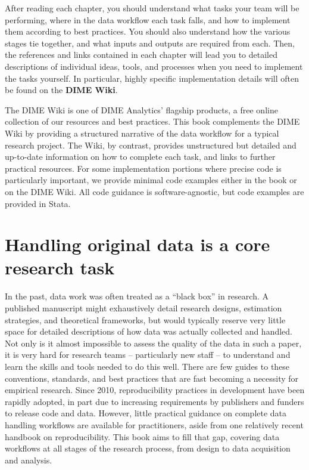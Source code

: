 After reading each chapter, you should understand
what tasks your team will be performing,
where in the data workflow each task falls,
and how to implement them according to best practices.
You should also understand how the various stages tie together,
and what inputs and outputs are required from each.
Then, the references and links contained in each chapter
will lead you to detailed descriptions of individual
ideas, tools, and processes when you need to implement the tasks yourself.
In particular, highly specific implementation details
will often be found on the \textbf{DIME Wiki}.

The DIME Wiki is one of DIME Analytics' flagship products,
a free online collection of our resources and best practices.
This book complements the DIME Wiki by providing a structured narrative
of the data workflow for a typical research project.
The Wiki, by contrast, provides unstructured but detailed and up-to-date information
on how to complete each task, and links to further practical resources.
For some implementation portions where precise code is particularly important,
we provide minimal code examples either in the book or on the DIME Wiki.
All code guidance is software-agnostic, but code examples are provided in Stata.

\section{Handling original data is a core research task}

In the past, data work was often treated as a ``black box'' in research.
A published manuscript might exhaustively detail
research designs, estimation strategies, and theoretical frameworks,
but would typically reserve very little space for detailed descriptions
of how data was actually collected and handled.
Not only is it almost impossible to assess the quality of the data in such a paper,
it is very hard for research teams -- particularly new staff --
to understand and learn the skills and tools needed to do this well.
There are few guides to these conventions, standards, and best practices
that are fast becoming a necessity for empirical research.
Since 2010, reproducibility practices in development have been rapidly adopted,\cite{swanson2020research}
in part due to increasing requirements by publishers and funders to release code and data.
However, little practical guidance on complete data handling workflows are available for practitioners,
aside from one relatively recent handbook on reproducibility.\cite{christensen2019transparent}
This book aims to fill that gap, 
covering data workflows at all stages of the research process,
from design to data acquisition and analysis.

